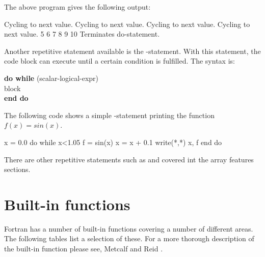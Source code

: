 The above program gives the following output:

\cmdmode

\begin{fortrancodeenv}
Cycling to next value.
Cycling to next value.
Cycling to next value.
Cycling to next value.
5
6
7
8
9
10
Terminates do-statement.
\end{fortrancodeenv}

\fmode

Another repetitive statement available is the -statement. With this statement, the code block can execute until a certain condition is fulfilled. The syntax is:

\begin{fsyntax}
\textbf{do while} (scalar-logical-expr)\\
\ftab block\\
\textbf{end do}
\end{fsyntax}

The following code shows a simple -statement printing the function $f(x)=sin(x)$.

\begin{fortrancodeenv}
x = 0.0
do while x<1.05
    f = sin(x)
    x = x + 0.1
    write(*,*) x, f
end do
\end{fortrancodeenv}

There are other repetitive statements such as  and  covered int the array features sections.

\section{Built-in functions}

Fortran has a number of built-in functions covering a number of different areas. The following tables list a selection of these. For a more thorough description of the built-in function please see, Metcalf and Reid \cite{metcalf00}.

